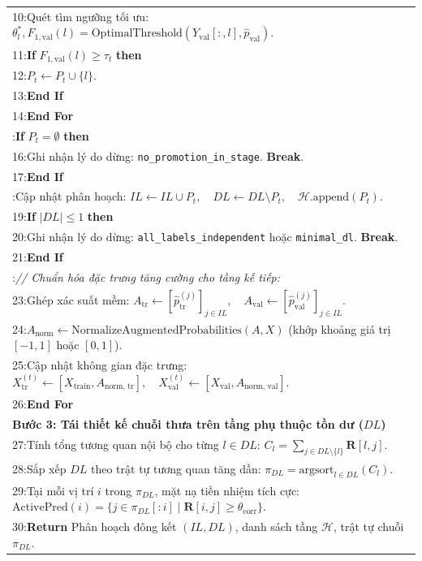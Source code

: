 \documentclass[11pt,a4paper]{article}
\begin{document}
\begin{table}[H]
\begin{tabular}{p{}}
10:\quad\quad\quad Quét tìm ngưỡng tối ưu: $\theta_l^*, F_{1, \text{val}}(l) = \text{OptimalThreshold}(Y_{\text{val}}[:, l], \hat{p}_{\text{val}})$. \\
11:\quad\quad\quad \textbf{If} $F_{1, \text{val}}(l) \ge \tau_t$ \textbf{then} \\
12:\quad\quad\quad\quad $P_t \leftarrow P_t \cup \{l\}$. \\
13:\quad\quad\quad \textbf{End If} \\
14:\quad\quad \textbf{End For} \\
\addlinespace
15:\quad\quad \textbf{If} $P_t = \emptyset$ \textbf{then} \\
16:\quad\quad\quad Ghi nhận lý do dừng: \texttt{no\_promotion\_in\_stage}. \textbf{Break}. \\
17:\quad\quad \textbf{End If} \\
\addlinespace
18:\quad\quad Cập nhật phân hoạch: $IL \leftarrow IL \cup P_t, \quad DL \leftarrow DL \setminus P_t, \quad \mathcal{H}\text{.append}(P_t)$. \\
19:\quad\quad \textbf{If} $|DL| \le 1$ \textbf{then} \\
20:\quad\quad\quad Ghi nhận lý do dừng: \texttt{all\_labels\_independent} hoặc \texttt{minimal\_dl}. \textbf{Break}. \\
21:\quad\quad \textbf{End If} \\
\addlinespace
22:\quad\quad \textit{// Chuẩn hóa đặc trưng tăng cường cho tầng kế tiếp:} \\
23:\quad\quad Ghép xác suất mềm: $A_{\text{tr}} \leftarrow [\hat{p}_{\text{tr}}^{(j)}]_{j \in IL}, \quad A_{\text{val}} \leftarrow [\hat{p}_{\text{val}}^{(j)}]_{j \in IL}$. \\
24:\quad\quad $A_{\text{norm}} \leftarrow \text{NormalizeAugmentedProbabilities}(A, X)$ \quad (khớp khoảng giá trị $[-1, 1]$ hoặc $[0, 1]$). \\
25:\quad\quad Cập nhật không gian đặc trưng: $X_{\text{tr}}^{(t)} \leftarrow [X_{\text{train}}, A_{\text{norm, tr}}], \quad X_{\text{val}}^{(t)} \leftarrow [X_{\text{val}}, A_{\text{norm, val}}]$. \\
26:\quad \textbf{End For} \\
\addlinespace
\textbf{Bước 3: Tái thiết kế chuỗi thưa trên tầng phụ thuộc tồn dư ($DL$)} \\
27:\quad Tính tổng tương quan nội bộ cho từng $l \in DL$: $C_l = \sum_{j \in DL \setminus \{l\}} \mathbf{R}[l, j]$. \\
28:\quad Sắp xếp $DL$ theo trật tự tương quan tăng dần: $\pi_{DL} = \text{argsort}_{l \in DL}(C_l)$. \\
29:\quad Tại mỗi vị trí $i$ trong $\pi_{DL}$, mặt nạ tiền nhiệm tích cực: $\text{ActivePred}(i) = \{j \in \pi_{DL}[:i] \mid \mathbf{R}[i, j] \ge \theta_{\text{corr}}\}$. \\
30:\quad \textbf{Return} Phân hoạch đông kết $(IL, DL)$, danh sách tầng $\mathcal{H}$, trật tự chuỗi $\pi_{DL}$. \\
\bottomrule
\end{tabular}
\end{table}
\end{document}
